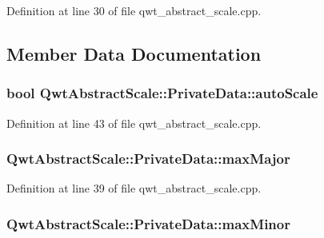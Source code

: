 Definition at line 30 of file qwt\-\_\-abstract\-\_\-scale.\-cpp.



\subsection{Member Data Documentation}
\hypertarget{class_qwt_abstract_scale_1_1_private_data_a1e95dca20554e3a6cb051871130994e8}{
\subsubsection[{auto\-Scale}]{\setlength{\rightskip}{0pt plus 5cm}bool Qwt\-Abstract\-Scale\-::\-Private\-Data\-::auto\-Scale}}\label{class_qwt_abstract_scale_1_1_private_data_a1e95dca20554e3a6cb051871130994e8}


Definition at line 43 of file qwt\-\_\-abstract\-\_\-scale.\-cpp.

\hypertarget{class_qwt_abstract_scale_1_1_private_data_a59e160f9663c1f57b216f9ae48f7f52e}{
\subsubsection[{max\-Major}]{ Qwt\-Abstract\-Scale\-::\-Private\-Data\-::max\-Major}}\label{class_qwt_abstract_scale_1_1_private_data_a59e160f9663c1f57b216f9ae48f7f52e}


Definition at line 39 of file qwt\-\_\-abstract\-\_\-scale.\-cpp.

\hypertarget{class_qwt_abstract_scale_1_1_private_data_a2d1f472599c7aaaf5a2410167b8dcc0d}{
\subsubsection[{max\-Minor}]{ Qwt\-Abstract\-Scale\-::\-Private\-Data\-::max\-Minor}}\label{class_qwt_abstract_scale_1_1_private_data_a2d1f472599c7aaaf5a2410167b8dcc0d}


